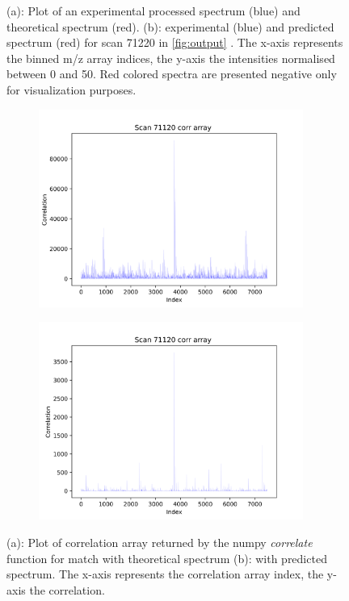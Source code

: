 \documentclass[11pt]{article}
\begin{document}
\begin{figure}
\caption{(a): Plot of an experimental processed spectrum (blue) and theoretical spectrum (red). (b): experimental (blue) and predicted spectrum (red) for scan 71220 in \cref{fig:output} . The x-axis represents the binned m/z array indices, the y-axis the intensities normalised between 0 and 50. Red colored spectra are presented negative only for visualization purposes.}
\label{predandtheo}
\end{figure}

\begin{figure}
\centering
\begin{subfigure}[b]{1\textwidth}
    \includegraphics[width=0.95\textwidth]{figs/corrtheo.png}
   \caption{}
   \label{fig:corrtheo} 
\end{subfigure}
\begin{subfigure}[b]{1\textwidth}
   \includegraphics[width=0.95\textwidth]{figs/corrpredict.png}
   \caption{}
   \label{fig:corrpredict}
\end{subfigure}
\caption{(a): Plot of correlation array returned by the numpy \textit{correlate} function for match with theoretical spectrum (b): with predicted spectrum. The x-axis represents the correlation array index, the y-axis the correlation.}
\label{predandtheocorr}
\end{figure}
\end{document}
